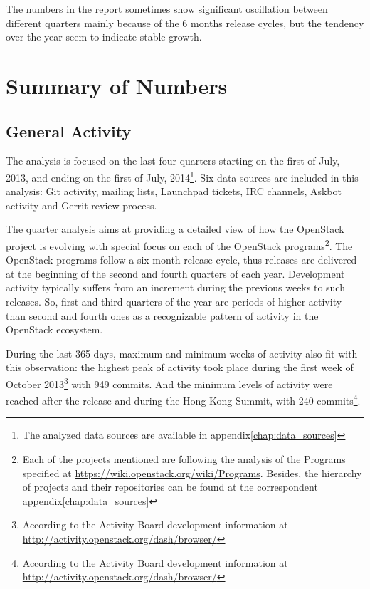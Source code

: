 \documentclass[a4wide,11pt]{report}
\begin{document}
The numbers in the report sometimes show significant oscillation between different quarters mainly because of the 6 months release cycles, but the tendency over the year seem to indicate stable growth.


\setcounter{tocdepth}{4}
\setcounter{secnumdepth}{4}
\tableofcontents


\chapter{Summary of Numbers}

\section{General Activity}

The analysis is focused on the last four quarters starting on the first of July, 2013, and ending on the first of July, 2014\footnote{The analyzed data sources are available in appendix\ref{chap:data_sources}}. Six data sources are included in this analysis: Git activity, mailing lists, Launchpad tickets, IRC channels, Askbot activity and Gerrit review process.

The quarter analysis aims at providing a detailed view of how the OpenStack project is evolving with special focus on each of the OpenStack programs\footnote{Each of the projects mentioned are following the analysis of the Programs specified at \url{https://wiki.openstack.org/wiki/Programs}. Besides, the hierarchy of projects and their repositories can be found at the correspondent appendix\ref{chap:data_sources}}. The OpenStack programs follow a six month release cycle, thus releases are delivered at the beginning of the second and fourth quarters of each year. Development activity typically suffers from an increment during the previous weeks to such releases. So, first and third quarters of the year are periods of higher activity than second and fourth ones as a recognizable pattern of activity in the OpenStack ecosystem.

During the last 365 days, maximum and minimum weeks of activity also fit with this observation: the highest peak of activity took place during the first week of October 2013\footnote{According to the Activity Board development information at
\url{http://activity.openstack.org/dash/browser/}} with 949 commits. And the minimum levels of activity were
reached after the release and during the Hong Kong Summit, with 240 commits\footnote{According to the Activity Board development information at
\url{http://activity.openstack.org/dash/browser/}}.
\end{document}
